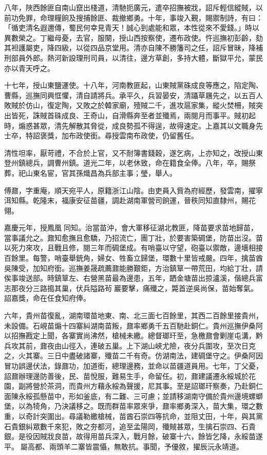 \begin{pinyinscope}
八年，陜西餘匪自南山竄出棧道，清馳扼廣元，遣卒招撫被戕，詔斥輕信縱賊，以前功免罪，命理糧餉及搜捕餘匪、裁撤鄉勇。十年，事竣入覲，賜禦制詩，有曰：「循吏清名遐邇傳，蜀民何幸見青天！誠心到處能和眾，本性從來不愛錢。」時以異數榮之。丁繼母憂，去官，服闋，授山西按察使，遷布政使。忤巡撫初彭齡，劾其袒護屬吏，降四級，以從四品京堂用。清亦自陳不勝籓司之任，詔斥冒昧，降補刑部員外郎。熱河新設理刑司員，以清往，邊方草創，多持大體，斷獄平允，蒙民亦以青天呼之。

十七年，授山東鹽運使。十八年，河南教匪起，山東賊黨硃成良等應之，陷定陶、曹縣，巡撫同興恇懼，清自請將兵。承平久，兵習晏安，清躡草屩先之，以五百人敗賊於仿山，復定陶，又敗之於韓家廟，殪賊二千，進攻扈家集，縱火焚柵，賊突出皆死，誅賊首硃成良、王奇山，自滑縣奔至者並殲焉，兩閱月而事平。賊初起時，煽惑甚眾，清先解散其脅從，成良勢孤不得逞，故得速定。上嘉其以文職身先士卒，特詔褒獎，加布政使銜。尋授雲南布政使，仍留舊任。

清性坦率，厭苛禮，不合於上官，又不耐簿書錢穀，遂乞病，上亦知之，改授山東登州鎮總兵，調曹州鎮。道光二年，以老休致，命在籍食全俸。八年，卒，賜祭葬，祀山東名宦，官其孫熾昌為兵部主事；瑩，舉人。

傅鼐，字重庵，順天宛平人，原籍浙江山陰。由吏員入貲為府經歷，發雲南，擢寧洱知縣。乾隆末，福康安征苗疆，調赴湖南軍營司餉運，晉秩同知直隸州，賜花翎。

嘉慶元年，授鳳凰同知。治當苗沖，會大軍移征湖北教匪，降苗要求苗地歸苗，當事議允之。鼐知愈撫且愈驕，乃招流亡，團丁壯，於要害築碉堡，防苗出沒。苗以死力來攻，且戰且修，閱三年而碉堡成。有哨臺以守望，砲臺以禦敵，邊墻相接百餘里。每警，哨臺舉銃角，婦女、牲畜立歸堡，環數十里皆戒嚴。四年，擒苗酋吳陳受，加知府銜。巡撫姜晟疏薦鼐能勝艱鉅，方治鎮筸一帶荒田，均給丁壯，請俟事竣送部。時鎮筸左、右營黑苗最為邊患，五年，跴金塘苗出掠瀘溪，偕總兵富志那夜分三路搗其巢，伏兵隘路茍巖要擊，痛殲之，斃首逆吳尚保，苗始奪氣。詔嘉獎，命在任食知府俸。

六年，貴州苗復亂，湖南環苗地東、南、北三面七百餘里，其西二百餘里接貴州，未設備。石峴苗煽十四寨糾湖南苗叛，鼐率鄉勇千五百馳赴銅仁。貴州巡撫伊桑阿以招撫戡定上聞，各寨實尚沸然，槍械未繳。總督瑯玕至，急檄鼐會剿崖屯溝，黔兵攻其前，鼐夜由山徑入，連破五巢。上下湖山峽尤險，夜分兵圍攻，至次日克之，火其寨。三日中盡破諸寨，殲苗二千有奇。仿湖南法，建碉堡守之。伊桑阿因冒功誤邊伏法，錄鼐功，加道銜，總理邊務，並命以苗疆道員用。七年，丁父憂，詔鼐辦理邊防善後，民、苗悅服，難易生手，命留任。初，鼐建議遷永綏城於花園，副將營於茶洞，而貴州方藉永綏為聲援，尼其事。至是詔瑯玕察奏，乃赴銅仁面陳永綏孤懸苗中，形如釜底，有二難、三可慮；並請移湖南守備於貴州邊境螺螄堡，以為犄角，乃決議移之。既而群苗率眾來爭，鼐率鄉勇深入，苗大集，環之數重，以奇計突圍出。尋議勒繳槍械，苗酋石崇四等抗命，並阻丈田，十年，與其黨石貴銀糾眾數千來犯，敗之夯都河，追至孟陽岡，殲賊甚眾，生擒石崇四、石貴銀。是役因賊戕良苗，故得用苗兵深入，戰月餘，破寨十六，餘皆乞降，永綏苗遂平。屬高都、兩頭羊二寨皆震懾，無敢抗。事聞，予優敘，擢辰沅永靖道。


\end{pinyinscope}
